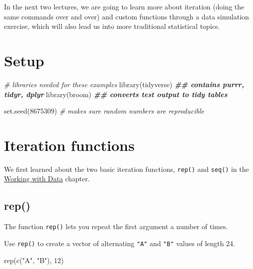 \documentclass[
  oneside]{book}
\newenvironment{Shaded}{\begin{snugshade}}{\end{snugshade}}
\newcommand{\CommentTok}[1]{\textcolor[rgb]{0.56,0.35,0.01}{\textit{#1}}}
\newcommand{\DecValTok}[1]{\textcolor[rgb]{0.00,0.00,0.81}{#1}}
\newcommand{\DocumentationTok}[1]{\textcolor[rgb]{0.56,0.35,0.01}{\textbf{\textit{#1}}}}
\newcommand{\FunctionTok}[1]{\textcolor[rgb]{0.00,0.00,0.00}{#1}}
\newcommand{\NormalTok}[1]{#1}
\newcommand{\StringTok}[1]{\textcolor[rgb]{0.31,0.60,0.02}{#1}}
\begin{document}
In the next two lectures, we are going to learn more about iteration (doing the same commands over and over) and custom functions through a data simulation exercise, which will also lead us into more traditional statistical topics.

\hypertarget{setup7}{%
\section{Setup}\label{setup7}}

\begin{Shaded}
\begin{Highlighting}[]
\CommentTok{\# libraries needed for these examples}
\FunctionTok{library}\NormalTok{(tidyverse)  }\DocumentationTok{\#\# contains purrr, tidyr, dplyr}
\FunctionTok{library}\NormalTok{(broom) }\DocumentationTok{\#\# converts test output to tidy tables}

\FunctionTok{set.seed}\NormalTok{(}\DecValTok{8675309}\NormalTok{) }\CommentTok{\# makes sure random numbers are reproducible}
\end{Highlighting}
\end{Shaded}

\hypertarget{iteration-functions}{%
\section{Iteration functions}\label{iteration-functions}}

We first learned about the two basic iteration functions, \texttt{rep()} and \texttt{seq()} in the \protect\hyperlink{rep_seq}{Working with Data} chapter.

\hypertarget{rep}{%
\subsection{rep()}\label{rep}}

The function \texttt{rep()} lets you repeat the first argument a number of times.

Use \texttt{rep()} to create a vector of alternating \texttt{"A"} and \texttt{"B"} values of length 24.

\begin{Shaded}
\begin{Highlighting}[]
\FunctionTok{rep}\NormalTok{(}\FunctionTok{c}\NormalTok{(}\StringTok{"A"}\NormalTok{, }\StringTok{"B"}\NormalTok{), }\DecValTok{12}\NormalTok{)}
\end{Highlighting}
\end{Shaded}
\end{document}
